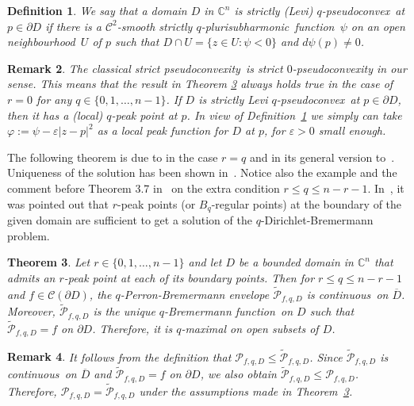 \documentclass[10pt,a4paper]{amsart}
\newtheorem{thm}{Theorem}[section]
\newtheorem{cor}[thm]{Corollary}
\newtheorem{defn}[thm]{Definition}
\newtheorem{rem}[thm]{Remark}
\numberwithin{equation}{section}
\newcommand{\cbb}{\mathbb{C}}
\newcommand{\ccal}{\mathcal{C}}
\newcommand{\pcal}{\mathcal{P}}
\newcommand{\sqpsh}{strictly $q$-pluri\-sub\-harmonic}
\newcommand{\qpsc}{$q$-pseudo\-convex}
\newcommand{\spscy}{strict pseudoconvexity}
\newcommand{\nbh}{neighbourhood}
\newcommand{\cont}{continuous}
\newcommand{\fct}{function}
\newcommand{\cld}{\overline{D}}
\newcommand{\D}{\displaystyle}
\newcommand{\eps}{\varepsilon}
\begin{document}
\begin{defn}\label{defn-sqpsc} We say that a domain $D$ in $\cbb^n$ is \textit{strictly (Levi) \qpsc}\ at $p \in \partial D$ if there is a $\ccal^2$-smooth \sqpsh\ \fct\ $\psi$ on an open \nbh\ $U$ of $p$ such that $D \cap U=\{z \in U : \psi<0\}$ and $d\psi(p)\neq 0$.
\end{defn}

\begin{rem}\label{rem-q-Dirichlet} The classical \spscy\ is strict $0$-pseudoconvexity in our sense. This means that the result in Theorem \ref{thm-q-Dirichlet} always holds true in the case of $r=0$ for any $q \in \{0,1,\ldots,n-1\}$. If $D$ is strictly Levi \qpsc\ at $p \in \partial D$, then it has a (local) $q$-peak point at $p$. In view of Definition~\ref{defn-sqpsc} we simply can take $\varphi:=\psi-\eps|z-p|^2$ as a local peak function for $D$ at $p$, for $\eps>0$ small enough.
\end{rem}

The following theorem is due to \cite{HM} in the case $r=q$ and in its general version to~\cite{Ka}. Uniqueness of the solution has been shown in~\cite{Sl84}. Notice also the example and the comment before Theorem 3.7 in~\cite{Bu} on the extra condition $r \leq q \leq n-r-1$. In~\cite{Dieu}, it was pointed out that $r$-peak points (or $B_q$-regular points) at the boundary of the given domain  are sufficient to get a solution of the $q$-Dirichlet-Bremermann problem.

\begin{thm}\label{thm-q-Dirichlet} Let $r \in \{0,1,\ldots,n-1\}$ and let $D$ be a bounded domain in $\cbb^n$ that admits an $r$-peak point at each of its boundary points. Then for $r \leq q \leq n-r-1$ and $f \in \ccal(\partial D)$, the $q$-Perron-Bremermann envelope $\widetilde{\pcal}_{f,q,D}$ is \cont\ on $\cld$. Moreover, $\widetilde{\pcal}_{f,q,D}$ is the unique $q$-Bremermann \fct\ on $D$ such that $\D \widetilde{\pcal}_{f,q,D} = f$ on $\partial D$. Therefore, it is $q$-maximal on open subsets of $D$.
\end{thm}





\begin{rem} It follows from the definition that $\pcal_{f,q,D} \leq \widetilde{\pcal}_{f,q,D}$. Since $\widetilde{\pcal}_{f,q,D}$ is \cont\ on $\cld$ and $\widetilde{\pcal}_{f,q,D}=f$ on $\partial D$, we also obtain $\widetilde{\pcal}_{f,q,D} \leq \pcal_{f,q,D}$. Therefore, $\pcal_{f,q,D} = \widetilde{\pcal}_{f,q,D}$ under the assumptions made in Theorem~\ref{thm-q-Dirichlet}.
\end{rem}
\end{document}

